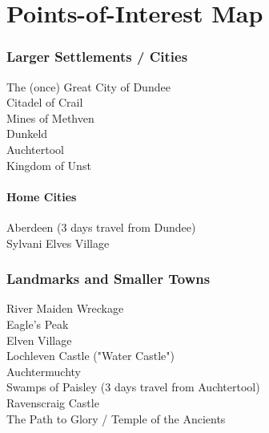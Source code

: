 \documentclass[letterpaper,openany,twoside,twocolumn]{book}
\begin{document}
	\chapter*{Points-of-Interest Map}
	\subsection*{Larger Settlements / Cities}
	 {\entryfont The (once) Great City of Dundee}\\
	 {\entryfont Citadel of Crail}\\
	 {\entryfont Mines of Methven}\\
	 {\entryfont Dunkeld}\\
	 {\entryfont Auchtertool}\\
	 {\entryfont Kingdom of Unst}
	\subsubsection*{Home Cities}
	 {\entryfont Aberdeen (3 days travel from Dundee)}\\
	 {\entryfont Sylvani Elves Village}\\
	\subsection*{Landmarks and Smaller Towns}
	 {\entryfont River Maiden Wreckage}\\
	 {\entryfont Eagle's Peak}\\
	 {\entryfont Elven Village}\\
	 {\entryfont Lochleven Castle ("Water Castle")}\\
	 {\entryfont Auchtermuchty}\\
	 {\entryfont Swamps of Paisley (3 days travel from Auchtertool)}\\
	 {\entryfont Ravenscraig Castle}\\
	 {\entryfont The Path to Glory / Temple of the Ancients}\\
\end{document}
